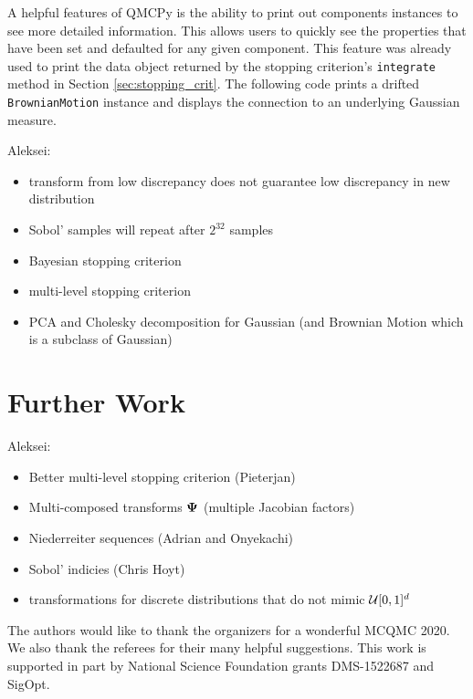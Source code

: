 \documentclass[graybox,footinfo]{svmult}
\newcommand{\AGSComment}[1]{{\color{cyan} Aleksei: #1}}
\begin{document}
A helpful features of QMCPy is the ability to print out components instances to see more detailed information. This allows users to quickly see the properties that have been set and defaulted for any given component. This feature was already used to print the data object returned by the stopping criterion's \texttt{integrate} method in Section \ref{sec:stopping_crit}. The following code prints a drifted \texttt{BrownianMotion} instance and displays the connection to an underlying Gaussian measure. 



\AGSComment{
\begin{itemize}
    \item transform from low discrepancy does not guarantee low discrepancy in new distribution
    \item Sobol' samples will repeat after $2^{32}$ samples
    \item Bayesian stopping criterion
    \item multi-level stopping criterion
    \item PCA and Cholesky decomposition for Gaussian (and Brownian Motion which is a subclass of Gaussian)
\end{itemize}}

\section{Further Work} \label{sec:further}

\AGSComment{
\begin{itemize}
    \item Better multi-level stopping criterion (Pieterjan)
    \item Multi-composed transforms ${\boldsymbol{\Psi}}$ (multiple Jacobian factors)
    \item Niederreiter sequences (Adrian and Onyekachi)
    \item Sobol' indicies (Chris Hoyt)
    \item transformations for discrete distributions that do not mimic ${\mathcal{U}}[0,1]^d$
\end{itemize}}

\begin{acknowledgement}
The authors would like to thank the organizers for a wonderful MCQMC 2020. 
We also thank the referees for their many helpful suggestions.  This work is supported in part by National Science Foundation grants DMS-1522687 and SigOpt.
\end{acknowledgement}
\end{document}
